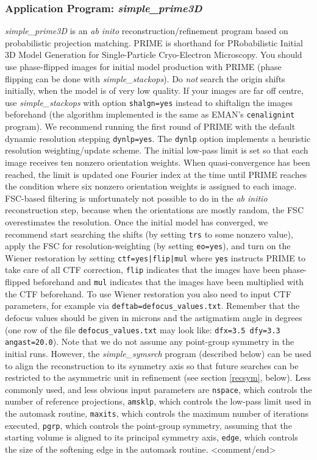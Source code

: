 \documentclass[review]{elsarticle}
\begin{document}
{{\subsubsection{Application Program: {\it{simple\_prime3D}}}
\label{prime3D}
{\it{simple\_prime3D}} is an \textit{ab inito} reconstruction/refinement program based on probabilistic projection matching. PRIME is shorthand for PRobabilistic Initial 3D Model Generation for Single-Particle Cryo-Electron Microscopy. You should use phase-flipped images for initial model production with PRIME (phase flipping can be done with {\it{simple\_stackops}}). Do \textit{not} search the origin shifts initially, when the model is of very low quality. If your images are far off centre, use {\it{simple\_stackops}} with option \texttt{shalgn=yes} instead to shiftalign the images beforehand (the algorithm implemented is the same as EMAN's \texttt{cenalignint} program). We recommend running the first round of PRIME with the default dynamic resolution stepping \texttt{dynlp=yes}. The \texttt{dynlp} option implements a heuristic resolution weighting/update scheme. The initial low-pass limit is set so that each image receives ten nonzero orientation weights. When quasi-convergence has been reached, the limit is updated one Fourier index at the time until PRIME reaches the condition where six nonzero orientation weights is assigned to each image. FSC-based filtering is unfortunately not possible to do in the \textit{ab initio} reconstruction step, because when the orientations are mostly random, the FSC overestimates the resolution. Once the initial model has converged, we recommend start searching the shifts (by setting \texttt{trs} to some nonzero value), apply the FSC for resolution-weighting (by setting \texttt{eo=yes}), and turn on the Wiener restoration by setting \texttt{ctf=yes|flip|mul} where \texttt{yes} instructs PRIME to take care of all CTF correction, \texttt{flip} indicates that the images have been phase-flipped beforehand and \texttt{mul} indicates that the images have been multiplied with the CTF beforehand. To use Wiener restoration you also need to input CTF parameters, for example via \texttt{deftab=defocus\_values.txt}. Remember that the defocus values should be given in microns and the astigmatism angle in degrees (one row of the file \texttt{defocus\_values.txt} may look like: \texttt{dfx=3.5  dfy=3.3  angast=20.0}). Note that we do not assume any point-group symmetry in the initial runs. However, the {\it{simple\_symsrch}} program (described below) can be used to align the reconstruction to its symmetry axis so that future searches can be restricted to the asymmetric unit in refinement (see section \ref{recsym}, below). Less commonly used, and less obvious input parameters are \texttt{nspace}, which controls the number of reference projections, \texttt{amsklp}, which controls the low-pass limit used in the automask routine, \texttt{maxits}, which controls the maximum number of iterations executed, \texttt{pgrp}, which controls the point-group symmetry, assuming that the starting volume is aligned to its principal symmetry axis, \texttt{edge}, which controls the size of the softening edge in the automask routine. <comment/end>\\
}}
\end{document}
